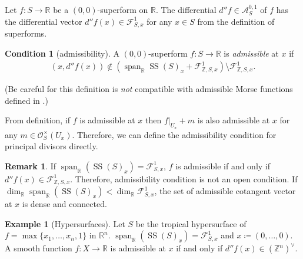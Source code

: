 \documentclass[a4paper,dvipdfmx,reqno,12pt]{amsart}
\theoremstyle{definition}
\newtheorem{example}[theorem]{Example}
\newtheorem{remark}[theorem]{Remark}
\newtheorem{condition}[theorem]{Condition}
\newcommand{\deq}{\coloneqq}
\newcommand{\Z}{\mathbb{Z}}%
\newcommand{\opn}[1]{\operatorname{#1}}
\numberwithin{equation}{section}
\begin{document}
Let $f\colon S \to \mathbb{R}$ be a $(0,0)$-superform on 
$\mathbb{R}$. The differential $d''f\in \mathcal{A}^{0,1}_S$ of $f$ has the 
differential vector $d''f (x)\in \mathcal{F}_{S,x}^{1}$ for any 
$x\in S$ from the definition of superforms.

\begin{condition}[{admissibility}] \label{cond: admissible}
A $(0,0)$-superform $f\colon S \to {\mathbb{R}}$ is \emph{admissible} at $x$ 
if 
\begin{align}
(x,d''f(x))\notin (\opn{span}_{{\mathbb{R}}}
\opn{SS}(S)_x+\mathcal{F}_{\mathbb{Z},S,x}^{1})
\setminus \mathcal{F}_{\mathbb{Z},S,x}^{1}.
\end{align}
\end{condition}
(Be careful for this definition is \emph{not} 
compatible with admissible Morse functions defined 
in \cite[p.156]{MR1336822}.)

From definition, if $f$ is admissible at $x$ then
$f|_{U_x}+m$ is also admissible at $x$ for any 
$m\in \mathcal{O}_{S}^{\times}(U_x)$.
Therefore, we can define the admissibility condition
for principal divisors directly.
\begin{remark}
If $\opn{span}_{{\mathbb{R}}}
(\opn{SS}(S)_x)=\mathcal{F}_{S,x}^{1}$,
$f$ is admissible if and only if 
$d''f(x)\in \mathcal{F}_{\mathbb{Z},S,x}^{1}$.
Therefore, admissibility
condition is not an open condition.
If $\dim_{\mathbb{R}} \opn{span}_{{\mathbb{R}}}
(\opn{SS}(S)_x)<\dim_{\mathbb{R}} \mathcal{F}_{S,x}^{1}$, the 
set of admissible cotangent vector at $x$ is dense and 
connected.
\end{remark}



\begin{example}[{Hypersurfaces}]

Let $S$ be the tropical hypersurface of
$f=\max\{x_1,\ldots,x_n,1\}$ in $\mathbb{R}^{n}$.
$\opn{span}_{{\mathbb{R}}}(\opn{SS}(S)_x)=\mathcal{F}_{S,x}^{1}$
and $x\deq (0,\ldots,0)$.
A smooth function $f\colon X\to {\mathbb{R}}$ is admissible at $x$
if and only if $d''f(x)\in (\Z^{n})^{\vee}$.
\end{example}
\end{document}
